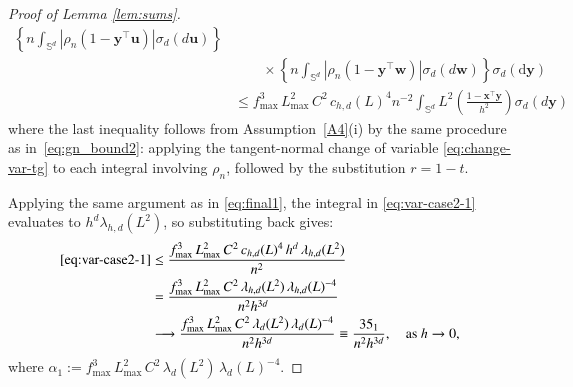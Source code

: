 \documentclass[12pt]{report} %
\newcommand{\bx}{\mathbf{x}}
\newcommand{\by}{\mathbf{y}}
\newcommand{\bw}{\mathbf{w}}
\newcommand{\bu}{\boldsymbol{u}}
\newcommand{\bxi}{\boldsymbol{\xi}}
\newcommand{\sigmad}{\sigma_{d}}
\newcommand{\sigmadm}{\sigma_{d-1}}
\newcommand{\rd}{\mathrm{d}}
\newcommand{\Sd}{\mathbb{S}^{d}}
\newcommand{\Sdm}{\mathbb{S}^{d-1}}
\begin{document}
\begin{proof}[Proof of Lemma \ref{lem:sums}]
\begin{align}
\left\{n\int_{\Sd}\left|\rho_n(1-\by^\top\bu)\right|
\sigmad(d\bu)\right\} \nonumber \\
&\qquad \times \left\{n\int_{\Sd}\left|\rho_n(1-\by^\top\bw)\right|
\sigmad(d\bw)\right\}\sigmad(\rd\by) \nonumber \\
&\leq f_{\max}^3\, L_{\max}^2\, C^2\, c_{h,d}(L)^4 n^{-2}
\int_{\Sd} L^2\!\left(\frac{1-\bx^\top\by}{h^2}\right)\sigmad(d\by) \label{eq:var-case2-1}
\end{align}
where the last inequality follows from Assumption~\ref{A4}(i) by the same procedure as in~\eqref{eq:gn_bound2}: applying the tangent-normal change of variable \eqref{eq:change-var-tg} to each integral involving $\rho_n$, followed by the substitution $r = 1 - t$.

Applying the same argument as in \eqref{eq:final1}, the integral in 
\eqref{eq:var-case2-1} evaluates to $h^d \lambda_{h,d}(L^2)$, so substituting back gives:
\begin{align*}
\eqref{eq:var-case2-1} 
&\leq \frac{f_{\max}^3\, L_{\max}^2\, C^2\, c_{h,d}(L)^4\, h^d\,\lambda_{h,d}(L^2)}{n^2} \\
&= \frac{f_{\max}^3\, L_{\max}^2\, C^2\, 
\lambda_{h,d}(L^2)\,\lambda_{h,d}(L)^{-4}}{n^2 h^{3d}} \\
&\longrightarrow \frac{f_{\max}^3\, L_{\max}^2\, C^2\, 
\lambda_{d}(L^2)\,\lambda_{d}(L)^{-4}}{n^2 h^{3d}} 
\equiv \frac{\alpha_1}{n^2 h^{3d}},
\quad \text{as } h \to 0,
\end{align*}
where $\alpha_1 := f_{\max}^3\, L_{\max}^2\, C^2\, 
\lambda_{d}(L^2)\,\lambda_{d}(L)^{-4}$.


\end{proof}
\end{document}
